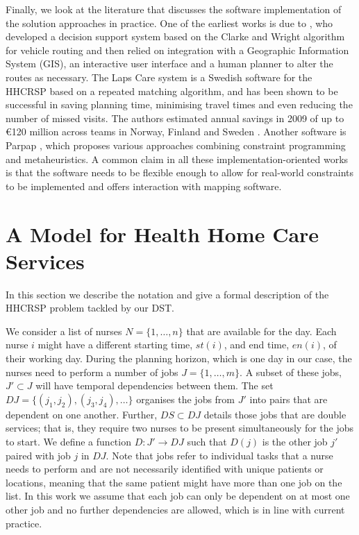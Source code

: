 \documentclass[a4paper,11pt,authoryear]{elsarticle}
\begin{document}
Finally, we look at the literature that discusses the software implementation of the solution approaches in practice. One of the earliest works is due to \cite{begur1997}, who developed a decision support system based on the Clarke and Wright algorithm \citep{clarke1964} for vehicle routing and then relied on integration with a Geographic Information System (GIS), an interactive user interface and a human planner to alter the routes as necessary. The Laps Care system \citep{eveborn2006, eveborn2009} is a Swedish software for the HHCRSP based on a repeated matching algorithm, and has been shown to be successful in saving planning time, minimising travel times and even reducing the number of missed visits. The authors estimated annual savings in 2009 of up to \euro 120 million across teams in Norway, Finland and Sweden \citep{eveborn2009}. Another software is Parpap \citep{bertels2006}, which proposes various approaches combining constraint programming and metaheuristics. A common claim in all these implementation-oriented works is that the software needs to be flexible enough to allow for real-world constraints to be implemented and offers interaction with mapping software.

\section{A Model for Health Home Care Services}
\label{sec:model}
\noindent In this section we describe the notation and give a formal description of the HHCRSP problem tackled by our DST.

We consider a list of nurses $N = \{1,\dots,n\}$ that are available for the day. Each nurse $i$ might have a different starting time, $st(i)$, and end time, $en(i)$, of their working day. During the planning horizon, which is one day in our case, the nurses need to perform a number of jobs $J = \{1,\dots,m\}$. A subset of these jobs, $J' \subset J$ will have temporal dependencies between them. The set $DJ = \{(j_1, j_2), (j_3,j_4),\dotsc \}$ organises the jobs from $J'$ into pairs that are dependent on one another. Further, $DS \subset DJ$ details those jobs that are double services; that is, they require two nurses to be present simultaneously for the jobs to start. We define a function $D : J' \to DJ$ such that $D(j)$ is the other job $j'$ paired with job $j$ in $DJ$. Note that jobs refer to individual tasks that a nurse needs to perform and are not necessarily identified with unique patients or locations, meaning that the same patient might have more than one job on the list. In this work we assume that each job can only be dependent on at most one other job and no further dependencies are allowed, which is in line with current practice. 
\end{document}
